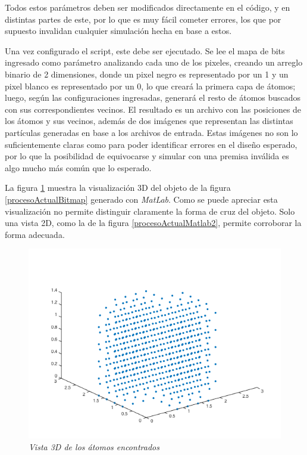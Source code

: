 Todos estos parámetros deben ser modificados directamente en el código, y en distintas partes de este, por lo que es muy fácil cometer errores, los que por supuesto invalidan cualquier simulación hecha en base a estos.

Una vez configurado el script, este debe ser ejecutado. Se lee el mapa de bits ingresado como parámetro analizando cada uno de los pixeles, creando un arreglo binario de 2 dimensiones, donde un pixel negro es representado por un 1 y un pixel blanco es representado por un 0, lo que creará la primera capa de átomos; luego, según las configuraciones ingresadas, generará el resto de átomos buscados con sus correspondientes vecinos. El resultado es un archivo con las posiciones de los átomos y sus vecinos, además de dos imágenes que representan las distintas partículas generadas en base a los archivos de entrada. Estas imágenes no son lo suficientemente claras como para poder identificar errores en el diseño esperado, por lo que la posibilidad de equivocarse y simular con una premisa inválida es algo mucho más común que lo esperado.

La figura \ref{procesoActualMatlab1} muestra la visualización 3D del objeto de la figura \ref{procesoActualBitmap} generado con \emph{MatLab}. Como se puede apreciar esta visualización no permite distinguir claramente la forma de cruz del objeto. Solo una vista 2D, como la de la figura \ref{procesoActualMatlab2}, permite corroborar la forma adecuada.

\begin{figure}[ht]
  \centering
  \includegraphics[scale=.6]{images/procesoActualMatlab1}
  \caption{\em Vista 3D de los átomos encontrados}
  \label{procesoActualMatlab1}
\end{figure}

